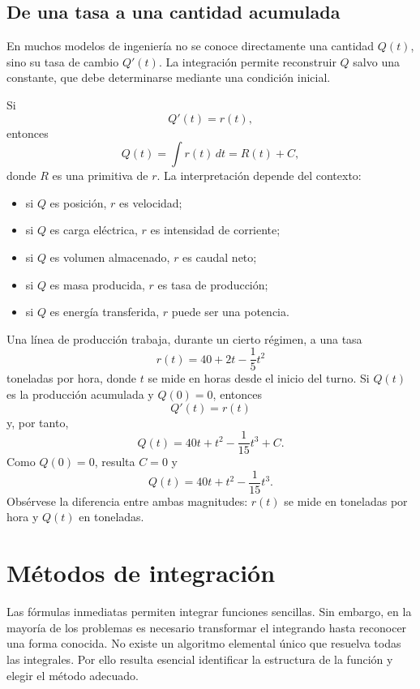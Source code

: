 \subsection{De una tasa a una cantidad acumulada}

En muchos modelos de ingeniería no se conoce directamente una cantidad $Q(t)$, sino su tasa de cambio $Q'(t)$. La integración permite reconstruir $Q$ salvo una constante, que debe determinarse mediante una condición inicial.

Si
\[
Q'(t)=r(t),
\]
entonces
\[
Q(t)=\int r(t)\,dt=R(t)+C,
\]
donde $R$ es una primitiva de $r$. La interpretación depende del contexto:

\begin{itemize}
\item si $Q$ es posición, $r$ es velocidad;
\item si $Q$ es carga eléctrica, $r$ es intensidad de corriente;
\item si $Q$ es volumen almacenado, $r$ es caudal neto;
\item si $Q$ es masa producida, $r$ es tasa de producción;
\item si $Q$ es energía transferida, $r$ puede ser una potencia.
\end{itemize}

\begin{example}
Una línea de producción trabaja, durante un cierto régimen, a una tasa
\[
r(t)=40+2t-\frac15t^2
\]
toneladas por hora, donde $t$ se mide en horas desde el inicio del turno. Si $Q(t)$ es la producción acumulada y $Q(0)=0$, entonces
\[
Q'(t)=r(t)
\]
y, por tanto,
\[
Q(t)=40t+t^2-\frac1{15}t^3+C.
\]
Como $Q(0)=0$, resulta $C=0$ y
\[
\boxed{Q(t)=40t+t^2-\frac1{15}t^3.}
\]
Obsérvese la diferencia entre ambas magnitudes: $r(t)$ se mide en toneladas por hora y $Q(t)$ en toneladas.
\end{example}

\section{Métodos de integración}
\label{sec:metodos-integracion}

Las fórmulas inmediatas permiten integrar funciones sencillas. Sin embargo, en la mayoría de los problemas es necesario transformar el integrando hasta reconocer una forma conocida. No existe un algoritmo elemental único que resuelva todas las integrales. Por ello resulta esencial identificar la estructura de la función y elegir el método adecuado.

